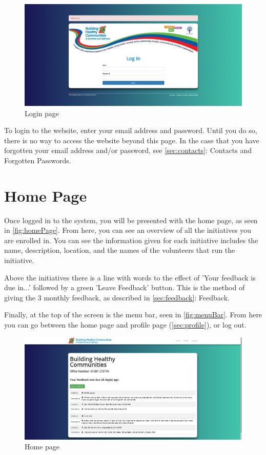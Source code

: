 \documentclass{bhcguides}
\begin{document}
\begin{figure}[h!]
 \centerline{\includegraphics[width=\textwidth, height=\textheight, keepaspectratio]{loginscreen.png}}
 \caption{Login page}
 \label{fig:initialLogin}
\end{figure}

To login to the website, enter your email address and password. Until you do so, there is no way to access the website beyond this page. In the case that you have forgotten your email address and/or password, see \autoref{sec:contacts}: Contacts and Forgotten Passwords.

\pagebreak

\section{Home Page}
\label{sec:homepage}

Once logged in to the system, you will be presented with the home page, as seen in \autoref{fig:homePage}. From here, you can see an overview of all the initiatives you are enrolled in. You can see the information given for each initiative includes the name, description, location, and the names of the volunteers that run the initiative.

Above the initiatives there is a line with words to the effect of 'Your feedback is due in...' followed by a green 'Leave Feedback' button. This is the method of giving the 3 monthly feedback, as described in \autoref{sec:feedback}: Feedback.

Finally, at the top of the screen is the menu bar, seen in \autoref{fig:menuBar}. From here you can go between the home page and profile page (\autoref{sec:profile}), or log out.

\begin{figure}[h]
 \centerline{\includegraphics[width=\textwidth, height=\textheight, keepaspectratio]{homepage.png}}
 \caption{Home page}
 \label{fig:homePage}
\end{figure}
\end{document}
